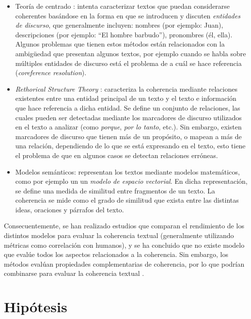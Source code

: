 \documentclass[12pt]{diicc}
\begin{document}
\begin{itemize}
	\item Teoría de centrado \cite{t36}: intenta caracterizar textos que puedan considerarse coherentes basándose en la forma en que se introducen y discuten {\em entidades de discurso}, que generalmente incluyen: nombres (por ejemplo: Juan), descripciones (por ejemplo: ``El hombre barbudo''), pronombres (él, ella). Algunos problemas que tienen estos métodos están relacionados con la ambigüedad que presentan algunos textos, por ejemplo cuando se habla sobre múltiples entidades de discurso está el problema de a cuál se hace referencia ({\em coreference resolution}).

	\item {\em Rethorical Structure Theory} \cite{t36}: caracteriza la coherencia mediante relaciones existentes entre una entidad principal de un texto y el texto e información que hace referencia a dicha entidad. Se define un conjunto de relaciones, las cuales pueden ser detectadas mediante los marcadores de discurso utilizados en el texto a analizar (como {\em porque}, {\em por lo tanto}, etc.). Sin embargo, existen marcadores de discurso que tienen más de un propósito, o mapean a más de una relación, dependiendo de lo que se está expresando en el texto, esto tiene el problema de que en algunos casos se detectan relaciones erróneas.
	
	\item Modelos semánticos: representan los textos mediante modelos matemáticos, como por ejemplo un un {\em modelo de espacio vectorial}. En dicha representación, se define una medida de similitud entre fragmentos de un texto. La coherencia se mide como el grado de similitud que exista entre las distintas ideas, oraciones y párrafos del texto. 

\end{itemize}

Consecuentemente, se han realizado estudios que comparan el rendimiento de los distintos modelos para evaluar la coherencia textual (generalmente utilizando métricas como correlación con humanos), y se ha concluido que no existe modelo que evalúe todos los aspectos relacionados a la coherencia. Sin embargo, los métodos evalúan propiedades complementarias de coherencia, por lo que podrían combinarse para evaluar la coherencia textual \cite{t33}.

\section{Hipótesis}
\end{document}
